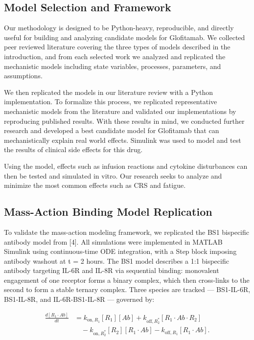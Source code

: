 \documentclass[11pt]{article}
\begin{document}
\subsection{Model Selection and Framework}

Our methodology is designed to be Python-heavy, reproducible, and directly useful for building and analyzing candidate models for Glofitamab. We collected peer reviewed literature covering the three types of models described in the introduction, and from each selected work we analyzed and replicated the mechanistic models including state variables, processes, parameters, and assumptions.
\par\medskip

We then replicated the models in our literature review with a Python implementation. To formalize this process, we replicated representative mechanistic models from the literature and validated our implementations by reproducing published results. With these results in mind, we conducted further research and developed a best candidate model for Glofitamab that can mechanistically explain real world effects. Simulink was used to model and test the results of clinical side effects for this drug.
\par\medskip

Using the model, effects such as infusion reactions and cytokine disturbances can then be tested and simulated in vitro. Our research seeks to analyze and minimize the most common effects such as CRS and fatigue.
\par\medskip

\subsection{Mass-Action Binding Model Replication}

To validate the mass-action modeling framework, we replicated the BS1 bispecific antibody model from [4]. All simulations were implemented in MATLAB Simulink using continuous-time ODE integration, with a Step block imposing antibody washout at t = 2 hours. The BS1 model describes a 1:1 bispecific antibody targeting IL-6R and IL-8R via sequential binding: monovalent engagement of one receptor forms a binary complex, which then cross-links to the second to form a stable ternary complex. Three species are tracked — BS1-IL-6R, BS1-IL-8R, and IL-6R-BS1-IL-8R — governed by:
\par\medskip


\begin{equation}
\begin{aligned}
\frac{d[R_1\cdot Ab]}{dt} &= k_{\mathrm{on},R_1}[R_1][Ab]+k_{\mathrm{off},R_2^{*}}[R_1\cdot Ab\cdot R_2]\\ &\quad-k_{\mathrm{on},R_2^{*}}[R_2][R_1\cdot Ab]-k_{\mathrm{off},R_1}[R_1\cdot Ab].
\end{aligned}
\label{eq:bs1-r1}
\end{equation}
\end{document}

